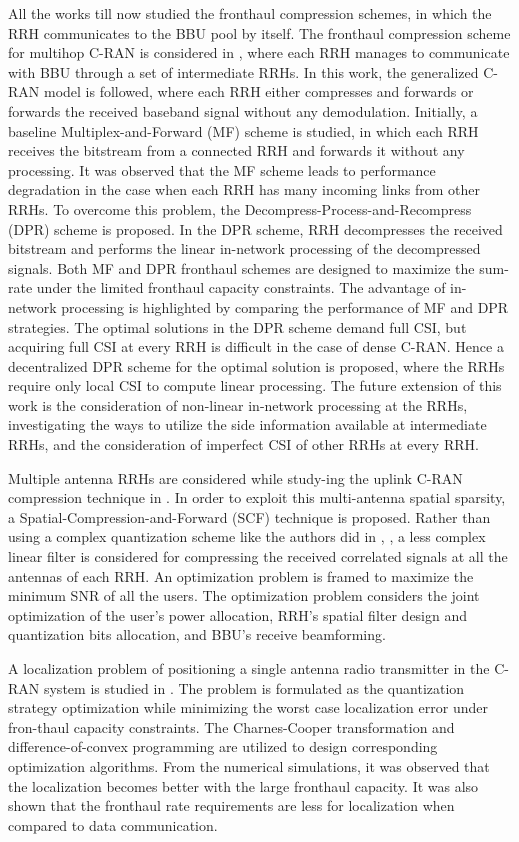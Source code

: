 \begin{multicols}{2}
\begin{itemize}
All the works till now studied the fronthaul compression schemes, in which the RRH communicates to the BBU pool by itself. The fronthaul compression scheme for multihop C-RAN is considered in \cite{art3-key56}, where each RRH manages to communicate with BBU through a set of intermediate RRHs. In this work, the generalized C-RAN model is followed, where each RRH either compresses and forwards or forwards the received baseband signal without any demodulation. Initially, a baseline Multiplex-and-Forward (MF) scheme is studied, in which each RRH receives the bitstream from a connected RRH and forwards it without any processing. It was observed that the MF scheme leads to performance degradation in the case when each RRH has many incoming links from other RRHs. To overcome this problem, the Decompress-Process-and-Recompress (DPR) scheme is proposed. In the DPR scheme, RRH decompresses the received bitstream and performs the linear in-network processing of the decompressed signals. Both MF and DPR fronthaul schemes are designed to maximize the sum-rate under the limited fronthaul capacity constraints. The advantage of in-network processing is highlighted by comparing the performance of MF and DPR strategies. The optimal solutions in the DPR scheme demand full CSI, but acquiring full CSI at every RRH is difficult in the case of dense C-RAN. Hence a decentralized DPR scheme for the optimal solution is proposed, where the RRHs require only local CSI to compute linear processing. The future extension of this work is the consideration of non-linear in-network processing at the RRHs, investigating the ways to utilize the side information available at intermediate RRHs, and the consideration of imperfect CSI of other RRHs at every RRH.

Multiple antenna RRHs are considered while study-ing the uplink C-RAN compression technique in \cite{art3-key57}. In order to exploit this multi-antenna spatial sparsity, a Spatial-Compression-and-Forward (SCF) technique is proposed. Rather than using a complex quantization scheme like the authors did in \cite{art3-key51}, \cite{art3-key53}, a less complex linear filter is considered for compressing the received correlated signals at all the antennas of each RRH. An optimization problem is framed to maximize the minimum SNR of all the users. The optimization problem considers the joint optimization of the user’s power allocation, RRH’s spatial filter design and quantization bits allocation, and BBU’s receive beamforming.

A localization problem of positioning a single antenna radio transmitter in the C-RAN system is studied in \cite{art3-key58}. The problem is formulated as the quantization strategy optimization while minimizing the worst case localization error under fron-thaul capacity constraints. The Charnes-Cooper transformation and difference-of-convex programming are utilized to design corresponding optimization algorithms. From the numerical simulations, it was observed that the localization becomes better with the large fronthaul capacity. It was also shown that the fronthaul rate requirements are less for localization when compared to data communication.


\end{itemize}
\end{multicols}
